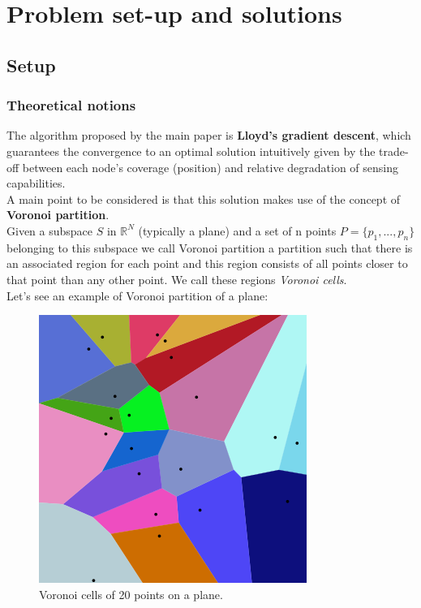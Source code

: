 \documentclass[a4paper,11pt,oneside]{book}
\begin{document}
	
	
	\chapter{Problem set-up and solutions}
	
	
	\section{Setup}
	\subsection {Theoretical notions}
	
	The algorithm proposed by the main paper is \textbf{Lloyd's gradient descent}, which guarantees the convergence to an optimal solution intuitively given by the trade-off between each node's coverage (position) and relative degradation of sensing capabilities.\\
	A main point to be considered is that this solution makes use of the concept of \textbf{Voronoi partition}.\\
	Given a subspace $S$ in $\mathbb{R}^N$ (typically a plane) and a set of n points $P=\{p_1,...,p_n\}$ belonging to this subspace we call Voronoi partition a partition such that there is an associated region for each point and this region consists of all points closer to that point than any other point. We call these regions \emph{Voronoi cells}.\\
	Let's see an example of Voronoi partition of a plane:\\
	
	\begin{figure}[hb]
		
		\centering
		
		\includegraphics[scale=0.33]{figs/VoronoiPartition.png}
		\caption{Voronoi cells of 20 points on a plane.}\label{fig:Voronoi Partition.png}	
	\end{figure}
	
\end{document}
